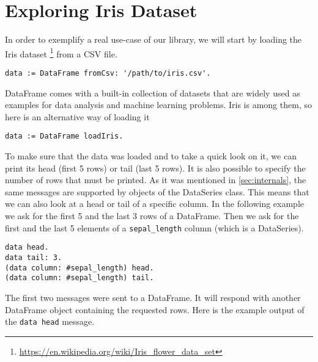 \documentclass[sigplan]{acmart}
\begin{document}
\section{Exploring Iris Dataset}
\label{sec:iris-eda}
%
%

In order to exemplify a real use-case of our library, we will start by loading the Iris dataset \footnote{\url{https://en.wikipedia.org/wiki/Iris_flower_data_set}} from a CSV file.

\begin{lstlisting}[basicstyle=\small,language=Smalltalk]
data := DataFrame fromCsv: '/path/to/iris.csv'.
\end{lstlisting}

DataFrame comes with a built-in collection of datasets that are widely used as examples for data analysis and machine learning problems. Iris is among them, so here is an alternative way of loading it

\begin{lstlisting}[basicstyle=\small,language=Smalltalk]
data := DataFrame loadIris.
\end{lstlisting}

To make sure that the data was loaded and to take a quick look on it, we can print its head (first 5 rows) or tail (last 5 rows). It is also possible to specify the number of rows that must be printed. As it was mentioned in \ref{sec:internals}, the same messages are supported by objects of the DataSeries class. This means that we can also look at a head or tail of a specific column. In the following example we ask for the first 5 and the last 3 rows of a DataFrame. Then we ask for the first and the last 5 elements of a \texttt{sepal\_length} column (which is a DataSeries).

\begin{lstlisting}[basicstyle=\small,language=Smalltalk]
data head.
data tail: 3.
(data column: #sepal_length) head.
(data column: #sepal_length) tail.
\end{lstlisting}

The first two messages were sent to a DataFrame. It will respond with another DataFrame object containing the requested rows. Here is the example output of the \texttt{data head} message.
\end{document}
